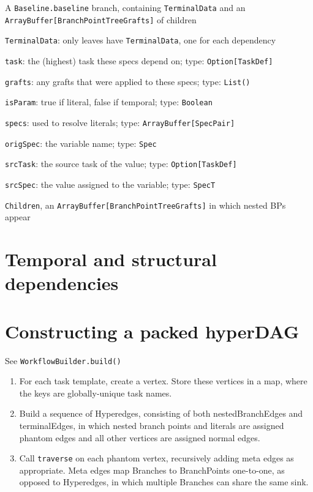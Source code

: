 \documentclass{report}
\begin{document}
        \quad \quad A \texttt{Baseline.baseline} branch, containing \texttt{TerminalData} and an \texttt{ArrayBuffer[BranchPointTreeGrafts]} of children
            
            \quad \quad \quad \texttt{TerminalData}: only leaves have \texttt{TerminalData}, one for each dependency
                
                \quad \quad \quad \quad \texttt{task}: the (highest) task these specs depend on; type: \texttt{Option[TaskDef]}
                
                \quad \quad \quad \quad \texttt{grafts}: any grafts that were applied to these specs; type: \texttt{List()}
                
                \quad \quad \quad \quad \texttt{isParam}: true if literal, false if temporal; type: \texttt{Boolean}
                
                \quad \quad \quad \quad \texttt{specs}: used to resolve literals; type: \texttt{ArrayBuffer[SpecPair]}
                    
                    \quad \quad \quad \quad \quad \texttt{origSpec}: the variable name; type: \texttt{Spec}
                    
                    \quad \quad \quad \quad \quad \texttt{srcTask}: the source task of the value; type: \texttt{Option[TaskDef]}
                    
                    \quad \quad \quad \quad \quad \texttt{srcSpec}: the value assigned to the variable; type: \texttt{SpecT}
            
            \quad \quad \quad \texttt{Children}, an \texttt{ArrayBuffer[BranchPointTreeGrafts]} in which nested BPs appear

\section{Temporal and structural dependencies}

\section{Constructing a packed hyperDAG}

See \texttt{WorkflowBuilder.build()}

\begin{enumerate}

\item For each task template, create a vertex. Store these vertices in a map, where the keys are globally-unique task names.

\item Build a sequence of Hyperedges, consisting of both nestedBranchEdges and terminalEdges, in which nested branch points and
      literals are assigned phantom edges and all other vertices are assigned normal edges.

\item Call \texttt{traverse} on each phantom vertex, recursively adding meta edges as appropriate. Meta edges map Branches to 
      BranchPoints one-to-one, as opposed to Hyperedges, in which multiple Branches can share the same sink.

\end{enumerate}




\end{document}
